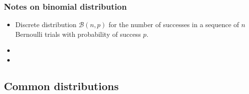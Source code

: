 \documentclass{article}
\begin{document}
\begin{multicols*}{2}
\subsubsection{Notes on binomial distribution}
\begin{itemize}
    \item Discrete distribution $\mathcal{B}(n, p)$ for the number of successes in a sequence of $n$ Bernoulli trials with probability of success $p$.
    \item 
    \item 
\end{itemize}




\end{multicols*}

\subsection{Common distributions}
\end{document}
